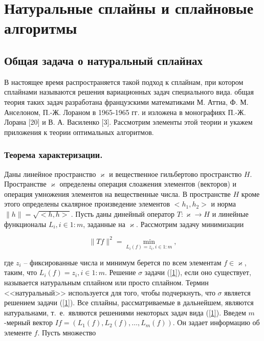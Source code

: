\documentclass{book}
\newcommand{\idest}{т.~е.\ }
\begin{document}
\chapter{Натуральные сплайны и сплайновые алгоритмы}


\section{Общая задача о натуральный сплайнах}
\setcounter{equation}{0}

В настоящее время распространяется такой подход к сплайнам, при котором сплайнами называются решения вариационных задач специального вида. общая теория таких задач разработана французскими математиками М. Аттиа, Ф. М. Анселоном, П.-Ж. Лораном в 1965-1965 гг. и изложена в монографиях  П.-Ж. Лорана [20] и В. А. Василенко [3]. Рассмотрим элементы этой теории и укажем приложения к теории оптимальных алгоритмов.

\subsection{Теорема характеризации.} Даны линейное пространство $\varkappa$ и вещественное гильбертово пространство $H$. Пространстве $\varkappa$ определены операция слоажения элементов (векторов) и операция умножения элементов на вещественные числа. В пространстве $H$ кроме этого определены скалярное произведение элементов $<h_1, h_2>$ и норма $\| h \|=\sqrt{<h,h>}$. Пусть даны динейный оператор $T:\varkappa\rightarrow H$ и линейные функционалы $L_i, i\in1:m$, заданные на $\varkappa$. Рассмотрим задачу минимизации

\begin{equation}
\|Tf\|^2=\min_{L_i(f)=z_i, i\in1:m},
\label{1}
\end{equation}

\noindent где $z_i$ -- фиксированные числа и минимум берется по всем элементам $f\in\varkappa$, таким, что $L_i(f)=z_i, i\in1:m$. Решение $\sigma$ задачи (\ref{1}), если оно существует, называется натуральным сплайном или просто сплайном. Термин <<натуральный>> используется для того, чтобы подчеркнуть, что $\sigma$ является решением задачи (\ref{1}). Все сплайны, рассматриваемые в дальнейшем, являются натуральнами, \idest являются решениями некоторых задач вида (\ref{1}).\newline
Введем $m$-мерный вектор $If=(L_1(f), L_2(f),\dots,L_m(f))$. Он задает информацию об элементе $f$. Пусть множество
\end{document}
